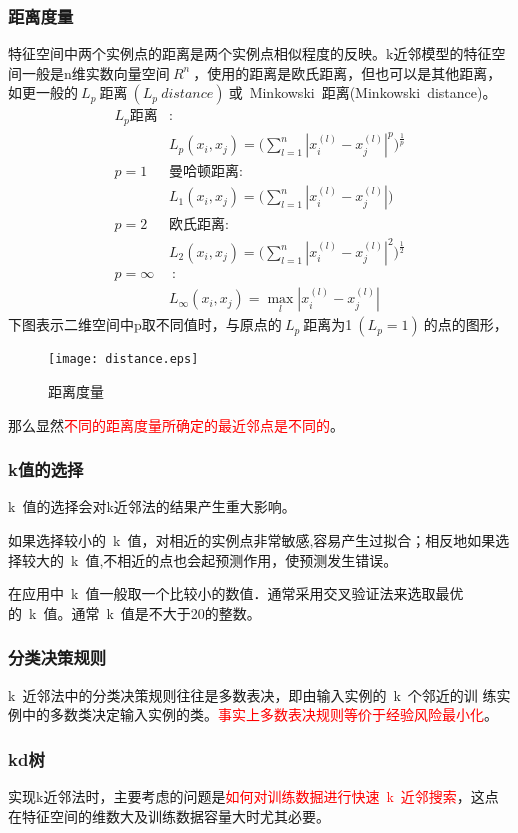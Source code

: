 \subsubsection{距离度量}
特征空间中两个实例点的距离是两个实例点相似程度的反映。k近邻模型的特征空间一般是n维实数向量空间$~R^n~$，使用的距离是欧氏距离，但也可以是其他距离， 如更一般的$~L_p~$距离$~(L_p~distance)~$或~Minkowski~距离(Minkowski~distance)。
\begin{align}
    L_p\text{距离}&: \nonumber\\
    &L_p(x_i,x_j)=\Big(\sum_{l=1}^{n}|x_i^{(l)}-x_j^{(l)}|^p\Big)^{\frac{1}{p}} \nonumber \\
    p=1~~~&\text{曼哈顿距离}:\nonumber \\
    &L_1(x_i,x_j)=\Big(\sum_{l=1}^{n}|x_i^{(l)}-x_j^{(l)}|\Big) \nonumber \\
    p=2~~~&\text{欧氏距离}:\nonumber\\
    &L_2(x_i,x_j)=\Big(\sum_{l=1}^{n}|x_i^{(l)}-x_j^{(l)}|^2\Big)^{\frac{1}{2}} \nonumber \\
    p=\infty~&~:\nonumber\\
    &L_\infty(x_i,x_j)=\max\limits_l |x_i^{(l)}-x_j^{(l)}| \nonumber
\end{align}
下图表示二维空间中p取不同值时，与原点的$~L_p~$距离为1$~(L_p=1)~$的点的图形，
\begin{figure}
  \centering
  \texttt{[image: distance.eps]}
  \caption{距离度量}
\end{figure}
那么显然\textcolor{red}{不同的距离度量所确定的最近邻点是不同的}。

\subsubsection{k值的选择}
k~值的选择会对k近邻法的结果产生重大影响。

如果选择较小的~k~值，对相近的实例点非常敏感,容易产生过拟合；相反地如果选择较大的~k~值,不相近的点也会起预测作用，使预测发生错误。

在应用中~k~值一般取一个比较小的数值．通常采用交叉验证法来选取最优的~k~值。通常~k~值是不大于20的整数。
\subsubsection{分类决策规则}
k~近邻法中的分类决策规则往往是多数表决，即由输入实例的~k~个邻近的训 练实例中的多数类决定输入实例的类。\textcolor{red}{事实上多数表决规则等价于经验风险最小化}。

\subsubsection{kd树}
实现k近邻法时，主要考虑的问题是\textcolor{red}{如何对训练数掘进行快速~k~近邻搜索}，这点在特征空间的维数大及训练数据容量大时尤其必要。

